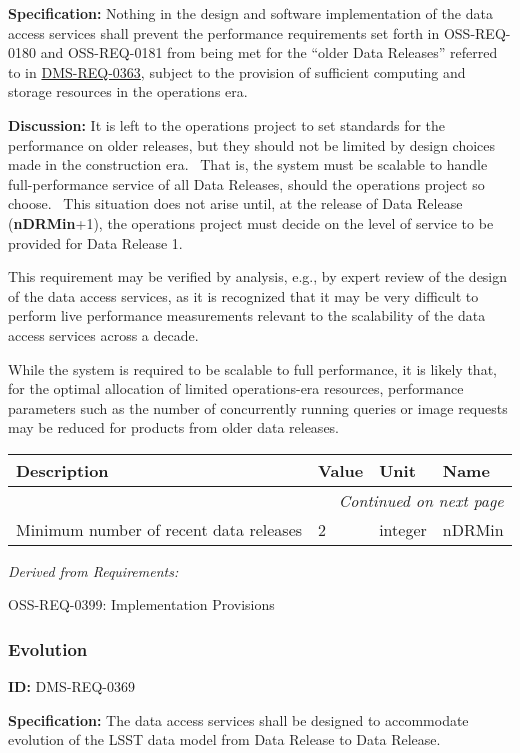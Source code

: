 \documentclass[SE,toc,lsstdraft]{lsstdoc}
\makeatletter
\newcommand{\paramname}[1]{\hspace{0pt}#1}
\newcommand{\unitname}[1]{\hspace{0pt}#1}
\newenvironment{parameters}[0]{%
\setlength\LTleft{0pt}
\setlength\LTright{\fill}
\begin{small}
\begin{longtable}[]{|p{0.49\textwidth}|l|p{0.6in}|p{1.70in}@{}|}

\hline \textbf{Description} & \textbf{Value} & \textbf{Unit} & \textbf{Name} \\ \hline
\endhead

\hline \multicolumn{4}{r}{\emph{Continued on next page}} \\
\endfoot

\hline\hline
\endlastfoot
}{%
\hline
\end{longtable}
\end{small}
}
\makeatother
\begin{document}
\textbf{Specification:}
Nothing in the design and software implementation of the data access services shall prevent the performance requirements set forth in OSS-REQ-0180 and OSS-REQ-0181 from being met for the “older Data Releases” referred to in \hyperref[DMS-REQ-0363]{DMS-REQ-0363}, subject to the provision of sufficient computing and storage resources in the operations era.

\textbf{Discussion:}
It is left to the operations project to set standards for the performance on older releases, but they should not be limited by design choices made in the construction era.  That is, the system must be scalable to handle full-performance service of all Data Releases, should the operations project so choose.  This situation does not arise until, at the release of Data Release (\textbf{nDRMin}+1), the operations project must decide on the level of service to be provided for Data Release 1.

This requirement may be verified by analysis, e.g., by expert review of the design of the data access services, as it is recognized that it may be very difficult to perform live performance measurements relevant to the scalability of the data access services across a decade.

While the system is required to be scalable to full performance, it is likely that, for the optimal allocation of limited operations-era resources, performance parameters such as the number of concurrently running queries or image requests may be reduced for products from older data releases.

\begin{parameters}
Minimum number of recent data releases
&
2
&
\unitname{%
integer
}
&
\paramname{%
nDRMin
} \\\hline
\end{parameters}

\emph{Derived from Requirements:}

OSS-REQ-0399:
Implementation Provisions \newline

\subsubsection{Evolution}

\label{DMS-REQ-0369}
\textbf{ID:} DMS-REQ-0369

\textbf{Specification:}
The data access services shall be designed to accommodate evolution of the LSST data model from Data Release to Data Release.
\end{document}
